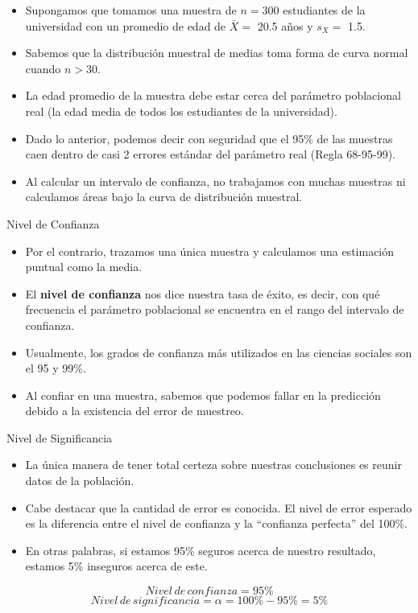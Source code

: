 \documentclass{beamer}
\begin{document}
\begin{frame}
\begin{itemize}
\justifying
\item Supongamos que tomamos una muestra de $n=300$ estudiantes de la universidad con un promedio de edad de $\bar{X}=$ 20.5 años y $s_{X}=$ 1.5.
\item Sabemos que la distribución muestral de medias toma forma de curva normal cuando $n>30$.
\item La edad promedio de la muestra debe estar cerca del parámetro poblacional real (la edad media de todos los estudiantes de la universidad).
\item Dado lo anterior, podemos decir con seguridad que el 95\% de las muestras caen dentro de casi 2 errores estándar del parámetro real (Regla 68-95-99).
\item Al calcular un intervalo de confianza, no trabajamos con muchas muestras ni calculamos áreas bajo la curva de distribución muestral. 
\end{itemize}
\end{frame}

\begin{frame}{Nivel de Confianza}
\begin{itemize}
\justifying
\item Por el contrario, trazamos una única muestra y calculamos una estimación puntual como la media. 
\item El {\bf nivel de confianza} nos dice nuestra tasa de éxito, es decir, con qué frecuencia el parámetro poblacional se encuentra en el rango del intervalo de confianza.
\item Usualmente, los grados de confianza más utilizados en las ciencias sociales son el 95 y 99\%.
\item Al confiar en una muestra, sabemos que podemos fallar en la predicción debido a la existencia del error de muestreo.
\end{itemize}
\end{frame}

\begin{frame}{Nivel de Significancia}
\begin{itemize}
\justifying

\item La única manera de tener total certeza sobre nuestras conclusiones es reunir datos de la población.
\item Cabe destacar que la cantidad de error es conocida. El nivel de error esperado es la diferencia entre el nivel de confianza y la ``confianza perfecta'' del 100\%.
\item En otras palabras, si estamos 95\% seguros acerca de nuestro resultado, estamos 5\% inseguros acerca de este.
\end{itemize}
$$Nivel \, de \, confianza =95\%$$
$$Nivel \, de \, significancia = \alpha= 100\%-95\%=5\%$$
\end{frame}
\end{document}
